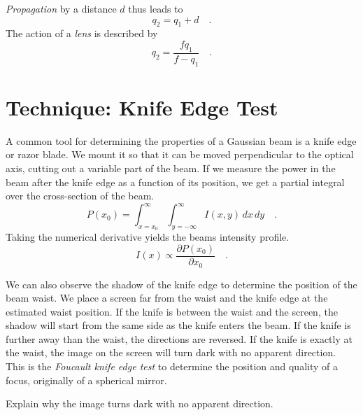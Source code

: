 \emph{Propagation} by a distance $d$ thus leads to 
\begin{equation}
    q_2 = q_1 + d \quad .
\end{equation}
The action of a \emph{lens} is described by
\begin{equation}
    q_2 = \frac{f q_1}{f - q_1} \quad .
\end{equation}




\section{Technique: Knife Edge Test}


A common tool for determining the properties of a Gaussian beam is a knife edge or razor blade. We mount it so that it can be moved perpendicular to the optical axis, cutting out a variable part of the beam. If we measure the power in the beam after the knife edge as a function of its position, we get a partial integral over the cross-section of the beam.
\begin{equation}
    P(x_0) = \int_{x=x_0}^\infty \int_{y=-\infty}^\infty I(x,y) \, dx \, dy \quad .
\end{equation}
Taking the numerical derivative yields the beams intensity profile.
\begin{equation}
    I(x) \propto \frac{\partial P(x_0)}{\partial x_0} \quad .
\end{equation}


We can also observe the shadow of the knife edge to determine the position of the beam waist. We place a screen far from the waist and the knife edge at the estimated waist position. If the knife is between the waist and the screen, the shadow will start from the same side as the knife enters the beam. If the knife is further away than the waist, the directions are reversed. If the knife is exactly at the waist, the image on the screen will turn dark with no apparent direction. This is the \emph{Foucault knife edge test} to determine the position and quality of a focus, originally of a spherical mirror.

\begin{questions}
    \item Explain why the image turns dark with no apparent direction.
\end{questions}

\printbibliography[segment=\therefsegment,heading=subbibliography]
